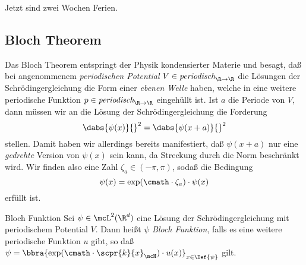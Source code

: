 \documentclass{subfiles}
\begin{document}
    Jetzt sind zwei Wochen Ferien. 

    \subsection*{Bloch Theorem}
        Das Bloch Theorem entspringt der Physik kondensierter Materie und besagt, daß bei angenommenem \emph{periodischen Potential} $V\in\textit{periodisch}_{\R\to\R}$ die Lösungen der Schrödingergleichung die Form einer \emph{ebenen Welle} haben, welche in eine weitere periodische Funktion $p\in\textit{periodisch}_{\R\to\R}$ eingehüllt ist. Ist $a$ die Periode von $V$, dann müssen wir an die Lösung der Schrödingergleichung die Forderung
        \[\dabs{\psi(x)}{}^2 = \dabs{\psi(x + a)}{}^2\]
        stellen. Damit haben wir allerdings bereits manifestiert, daß $\psi(x + a)$ nur eine \emph{gedrehte} Version von $\psi(x)$ sein kann, da Streckung durch die Norm beschränkt wird. Wir finden also eine Zahl $\zeta_a\in(-\pi,\pi)$, sodaß die Bedingung
        \[\psi(x) = \exp(\cmath\cdot\zeta_a)\cdot\psi(x)\]
        erfüllt ist. 
        \begin{mdef}{Bloch Funktion}
            Sei $\psi\in\mcL^2(\R^d)$ eine Lösung der Schrödingergleichung mit periodischem Potential $V$. Dann heißt $\psi$ \emph{Bloch Funktion}, falls es eine weitere periodische Funktion $u$ gibt, so daß $\psi = \bbra{\exp(\cmath\cdot\scpr{k}{x}_\mcH)\cdot u(x)}_{x\in\Def{\psi}}$ gilt.
        \end{mdef}
        
        
\end{document}
